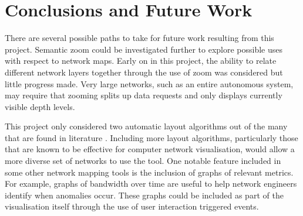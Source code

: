 \documentclass[11pt, a4paper]{article}
\begin{document}
\newpage


\section{Conclusions and Future Work}
\label{sec:conclusion}


There are several possible paths to take for future work resulting from this
project. Semantic zoom could be investigated further to explore possible uses
with respect to network maps. Early on in this project, the ability to relate
different network layers together through the use of zoom was considered but
little progress made. Very large networks, such as an entire autonomous system,
may require that zooming splits up data requests and only displays currently
visible depth levels. 

This project only considered two automatic layout algorithms out of the many
that are found in literature \cite{Battista_1994}. Including more layout
algorithms, particularly those that are known to be effective for computer
network visualisation, would allow a more diverse set of networks to use the
tool. One notable feature included in some other network mapping tools is the
inclusion of graphs of relevant metrics. For example, graphs of bandwidth over
time are useful to help network engineers identify when anomalies occur.  These
graphs could be included as part of the visualisation itself through the use of
user interaction triggered events.
\end{document}
